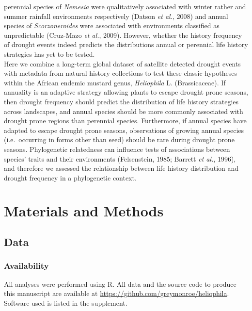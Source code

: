 \documentclass[man,floatsintext]{apa6}
\theoremstyle{definition}
\theoremstyle{definition}
\theoremstyle{definition}
\theoremstyle{remark}
\begin{document}
perennial species of \emph{Nemesia} were qualitatively associated with
winter rather and summer rainfall environments respectively (Datson
\emph{et al.}, 2008) and annual species of \emph{Scorzoneroides} were
associated with environments classified as unpredictable (Cruz-Mazo
\emph{et al.}, 2009). However, whether the history frequency of drought
events indeed predicts the distributions annual or perennial life
history strategies has yet to be tested.\\
Here we combine a long-term global dataset of satellite detected drought
events with metadata from natural history collections to test these
classic hypotheses within the African endemic mustard genus,
\emph{Heliophila} L. (Brassicaceae). If annuality is an adaptive
strategy allowing plants to escape drought prone seasons, then drought
frequency should predict the distribution of life history strategies
across landscapes, and annual species should be more commonly associated
with drought prone regions than perennial species. Furthermore, if
annual species have adapted to escape drought prone seasons,
observations of growing annual species (i.e.~occurring in forms other
than seed) should be rare during drought prone seasons. Phylogenetic
relatedness can influence tests of associations between species' traits
and their environments (Felsenstein, 1985; Barrett \emph{et al.}, 1996),
and therefore we assessed the relationship between life history
distribution and drought frequency in a phylogenetic context.

\hypertarget{materials-and-methods}{%
\section{Materials and Methods}\label{materials-and-methods}}

\hypertarget{data}{%
\subsection{Data}\label{data}}

\hypertarget{availability}{%
\subsubsection{Availability}\label{availability}}

All analyses were performed using R. All data and the source code to
produce this manuscript are available at
\url{https://github.com/greymonroe/heliophila}. Software used is listed
in the supplement.
\end{document}
